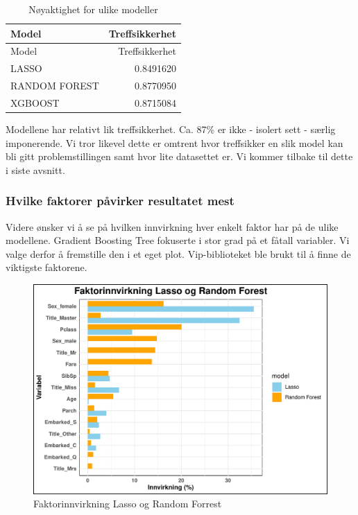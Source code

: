 \documentclass[
]{article}
\begin{document}
\begin{longtable}[]{@{}lr@{}}
\caption{Nøyaktighet for ulike modeller}\tabularnewline
\toprule\noalign{}
Model & Treffsikkerhet \\
\midrule\noalign{}
\endfirsthead
\toprule\noalign{}
Model & Treffsikkerhet \\
\midrule\noalign{}
\endhead
\bottomrule\noalign{}
\endlastfoot
LASSO & 0.8491620 \\
RANDOM FOREST & 0.8770950 \\
XGBOOST & 0.8715084 \\
\end{longtable}

Modellene har relativt lik treffsikkerhet. Ca. 87\% er ikke - isolert
sett - særlig imponerende. Vi tror likevel dette er omtrent hvor
treffsikker en slik model kan bli gitt problemstillingen samt hvor lite
datasettet er. Vi kommer tilbake til dette i siste avsnitt.

\subsubsection{Hvilke faktorer påvirker resultatet
mest}\label{hvilke-faktorer-puxe5virker-resultatet-mest}

Videre ønsker vi å se på hvilken innvirkning hver enkelt faktor har på
de ulike modellene. Gradient Boosting Tree fokuserte i stor grad på et
fåtall variabler. Vi valge derfor å fremstille den i et eget plot.
Vip-biblioteket ble brukt til å finne de viktigste faktorene.

\begin{figure}[H]

{\centering \includegraphics[width=0.8\linewidth]{presentation_files/figure-latex/unnamed-chunk-11-1} 

}

\caption{Faktorinnvirkning Lasso og Random Forrest}\label{fig:unnamed-chunk-11}
\end{figure}
\end{document}
